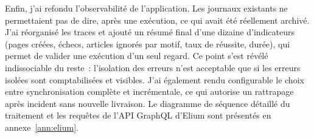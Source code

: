 Enfin, j'ai refondu l'observabilité de l'application. Les journaux existants ne
permettaient pas de dire, après une exécution, ce qui avait été réellement
archivé. J'ai réorganisé les traces et ajouté un résumé final d'une dizaine
d'indicateurs (pages créées, échecs, articles ignorés par motif, taux de
réussite, durée), qui permet de valider une exécution d'un seul regard. Ce point
s'est révélé indissociable du reste~: l'isolation des erreurs n'est acceptable
que si les erreurs isolées sont comptabilisées et visibles. J'ai également rendu
configurable le choix entre synchronisation complète et incrémentale, ce qui
autorise un rattrapage après incident sans nouvelle livraison. Le diagramme de
séquence détaillé du traitement et les requêtes de l'API GraphQL d'Elium sont
présentés en annexe~\ref{ann:elium}.
